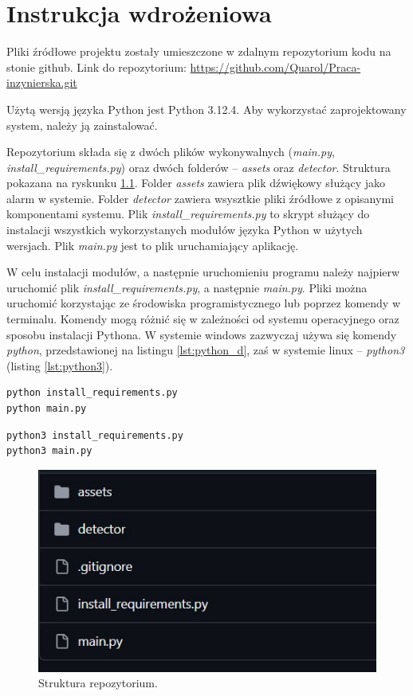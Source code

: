 \chapter{Instrukcja wdrożeniowa}
Pliki źródłowe projektu zostały umieszczone w zdalnym repozytorium kodu na stonie github. 
Link do repozytorium: \url{https://github.com/Quarol/Praca-inzynierska.git}

Użytą wersją języka Python jest Python 3.12.4. Aby wykorzystać zaprojektowany system, należy ją zainstalować.

Repozytorium składa się z dwóch plików wykonywalnych (\emph{main.py}, \emph{install\_requirements.py}) oraz dwóch folderów -- \emph{assets} oraz \emph{detector}. Struktura pokazana na ryskunku \ref{fig:repo}.
Folder \emph{assets} zawiera plik dźwiękowy służący jako alarm w systemie. Folder \emph{detector} zawiera wsysztkie pliki źródłowe z opisanymi komponentami systemu.
Plik \emph{install\_requirements.py} to skrypt służący do instalacji wszystkich wykorzystanych modułów języka Python w użytych wersjach.
Plik \emph{main.py} jest to plik uruchamiający aplikację.

W celu instalacji modułów, a następnie uruchomieniu programu należy najpierw uruchomić plik \emph{install\_requirements.py}, a następnie \emph{main.py}. Pliki można uruchomić korzystając ze środowiska programistycznego lub poprzez komendy w terminalu. Komendy mogą różnić się w zależności od systemu operacyjnego oraz sposobu instalacji Pythona. W systemie windows zazwyczaj używa się komendy \emph{python}, przedstawionej na listingu \ref{lst:python_d}, zaś w systemie linux -- \emph{python3} (listing \ref{lst:python3}).

\begin{lstlisting}[caption={Komendy do instalacji modułów oraz uruchomienia aplikacji nr 1.}, label={lst:python_d}]
python install_requirements.py
python main.py
\end{lstlisting}

\begin{lstlisting}[caption={Komendy do instalacji modułów oraz uruchomienia aplikacji nr 2.}, label={lst:python3}]
python3 install_requirements.py
python3 main.py
\end{lstlisting}

\begin{figure}[H]
    \centering
    \includegraphics[width=0.55\linewidth]{_repo.jpg}
    \caption{Struktura repozytorium.}
    \label{fig:repo}
\end{figure}


